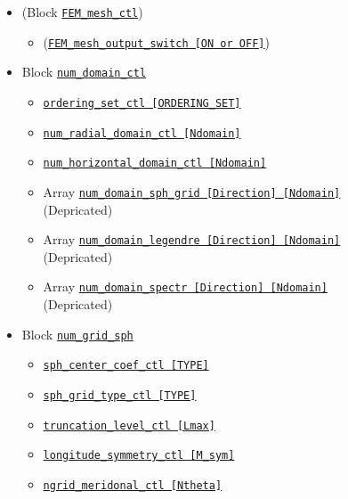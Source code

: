 		\begin{itemize}
		\item (Block \hyperref[href_t:FEM_mesh_ctl]{\tt FEM\_mesh\_ctl})
		\begin{itemize} \label{href_i:FEM_mesh_ctl}
		\item (\hyperref[href_t:FEM_mesh_output_switch]{\tt FEM\_mesh\_output\_switch [ON or OFF]})
		\end{itemize}
%
		\item Block \hyperref[href_t:num_domain_ctl]{\tt num\_domain\_ctl}
			\begin{itemize} \label{href_i:num_domain_ctl}
			\item \hyperref[href_t:ordering_set_ctl]{\tt ordering\_set\_ctl [ORDERING\_SET]}

			\item \hyperref[href_t:num_radial_domain_ctl]{\tt num\_radial\_domain\_ctl [Ndomain]}
			\item \hyperref[href_t:num_horizontal_domain_ctl]{\tt num\_horizontal\_domain\_ctl [Ndomain]}
%
            		\item {\color{magenta} Array \hyperref[href_t:num_domain_sph_grid]
				{\tt num\_domain\_sph\_grid    [Direction]    [Ndomain]} \\
				(Depricated)}
			\item {\color{magenta} Array \hyperref[href_t:num_domain_legendre]
				{\tt num\_domain\_legendre    [Direction]    [Ndomain]} \\
				(Depricated)}
			\item {\color{magenta} Array \hyperref[href_t:num_domain_spectr]
				{\tt num\_domain\_spectr      [Direction]    [Ndomain]} \\
				(Depricated)}
			\end{itemize}
%
		\item Block \hyperref[href_t:num_grid_sph]{\tt num\_grid\_sph}
			\begin{itemize} \label{href_i:num_grid_sph}
            \item \hyperref[href_t:sph_center_coef_ctl]{\tt sph\_center\_coef\_ctl   [TYPE]}
            \item \hyperref[href_t:sph_grid_type_ctl]{\tt   sph\_grid\_type\_ctl    [TYPE]}
	        \item \hyperref[href_t:truncation_level_ctl]{\tt truncation\_level\_ctl	[Lmax]}
            \item \hyperref[href_t:longitude_symmetry_ctl]{\tt longitude\_symmetry\_ctl    [M\_sym]}
			\item \hyperref[href_t:ngrid_meridonal_ctl]{\tt ngrid\_meridonal\_ctl [Ntheta]}

\end{itemize}
\end{itemize}
